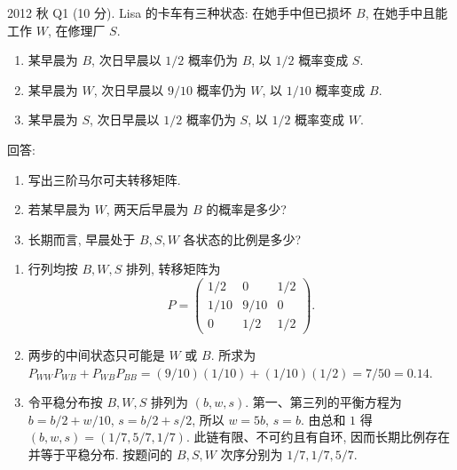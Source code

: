 \begin{exercise}\label{ex:fe2012q1}
2012 秋 Q1 (10 分). Lisa 的卡车有三种状态: 在她手中但已损坏 $B$, 在她手中且能工作 $W$, 在修理厂 $S$.
\begin{enumerate}[label=(\roman*)]
\item 某早晨为 $B$, 次日早晨以 $1/2$ 概率仍为 $B$, 以 $1/2$ 概率变成 $S$.
\item 某早晨为 $W$, 次日早晨以 $9/10$ 概率仍为 $W$, 以 $1/10$ 概率变成 $B$.
\item 某早晨为 $S$, 次日早晨以 $1/2$ 概率仍为 $S$, 以 $1/2$ 概率变成 $W$.
\end{enumerate}
回答:
\begin{enumerate}[label=(\alph*)]
\item\label{ex:fe2012q1-a} 写出三阶马尔可夫转移矩阵.
\item\label{ex:fe2012q1-b} 若某早晨为 $W$, 两天后早晨为 $B$ 的概率是多少?
\item\label{ex:fe2012q1-c} 长期而言, 早晨处于 $B,S,W$ 各状态的比例是多少?
\end{enumerate}
\end{exercise}
\begin{solution}
\begin{enumerate}[label=(\alph*)]
\item\label{sol:fe2012q1-a} 行列均按 $B,W,S$ 排列, 转移矩阵为
\[
 P=\begin{pmatrix}1/2&0&1/2\\1/10&9/10&0\\0&1/2&1/2\end{pmatrix}.
\]
\item\label{sol:fe2012q1-b} 两步的中间状态只可能是 $W$ 或 $B$. 所求为
$P_{WW}P_{WB}+P_{WB}P_{BB}=(9/10)(1/10)+(1/10)(1/2)=7/50=0.14$.
\item\label{sol:fe2012q1-c} 令平稳分布按 $B,W,S$ 排列为 $(b,w,s)$. 第一、第三列的平衡方程为 $b=b/2+w/10$, $s=b/2+s/2$, 所以 $w=5b$, $s=b$. 由总和 $1$ 得 $(b,w,s)=(1/7,5/7,1/7)$. 此链有限、不可约且有自环, 因而长期比例存在并等于平稳分布. 按题问的 $B,S,W$ 次序分别为 $1/7,1/7,5/7$.
\end{enumerate}
\end{solution}


